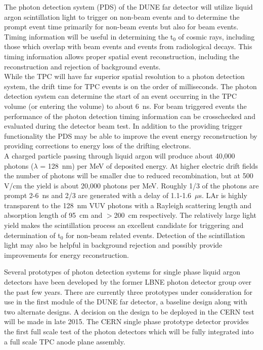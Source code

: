 



The photon detection system (PDS) of the DUNE far detector will utilize liquid argon scintillation light to trigger on non-beam events and to
determine the prompt event time primarily for non-beam events but also for beam events. 
Timing information will be useful in determining the t$_0$ of cosmic rays, including those which 
overlap with beam events and events from radiological decays. This timing information allows proper spatial event reconstruction, including 
the reconstruction and rejection of background events.\\
%
While the TPC will have far superior spatial resolution to a photon detection system, the drift time for TPC events is on the order of milliseconds. The photon detection system can determine the start of an event occurring in the TPC volume (or entering the volume) to about 6~ns. For beam triggered events the performance of the photon detection timing information can be crosschecked and evaluated during the detector beam test. 
In addition to the providing trigger functionality the PDS may be able to improve the event energy reconstruction by providing
corrections to energy loss of the drifting electrons. \\

A charged particle passing through liquid argon will produce about 40,000 photons ($\lambda$ = 128~nm) per MeV of deposited energy. 
At higher electric drift fields the number of photons will be smaller due to reduced recombination, but at 500 V/cm the yield is about 20,000 photons per MeV. Roughly 1/3 of the photons are prompt 2-6~ns and 2/3 are generated with a delay of 1.1-1.6~$\mu$s. LAr is highly transparent to the 128~nm VUV photons with a Rayleigh scattering length and absorption length of 95~cm \cite{rayleigh} and $>$200~cm \cite{absorption} respectively. The relatively large light yield makes the scintillation process an excellent candidate for triggering and  determination of t$_0$ for non-beam related events. Detection of the scintillation light may also be helpful in background rejection and possibly
provide improvements for energy reconstruction.

Several prototypes of photon detection systems for single phase liquid argon detectors have been developed by the former LBNE photon detector group over the past few years. There are currently three prototypes under consideration for use in the first module of the DUNE far detector, a baseline design along with two alternate designs. A decision on the design to be deployed in the CERN test will be made in late 2015. The CERN single phase prototype detector provides the first full scale test of the photon detectors which will be fully integrated into a 
full scale TPC anode plane assembly. 

